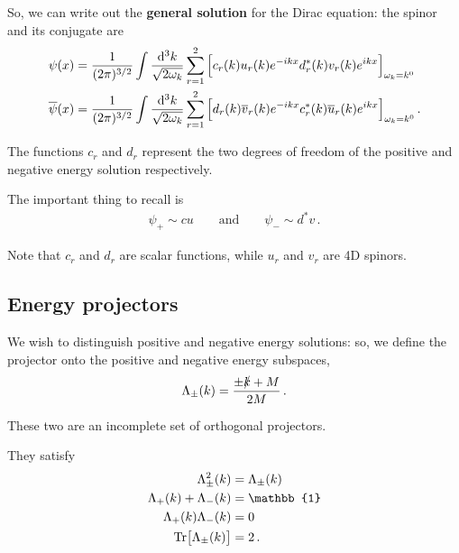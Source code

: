 \documentclass[main.tex]{subfiles}
\begin{document}

So, we can write out the \textbf{general solution} for the Dirac equation: the spinor and its conjugate are
%
\begin{subequations}
\begin{align}
\psi (x) &=
\frac{1}{(2 \pi )^{3/2}}
\int \frac{ \dd[3]{k}}{\sqrt{2 \omega_{k}}}
\sum _{r=1}^{2} \qty[
    c_r(k) u_r(k) e^{-ikx}
    d^{*}_{r} (k) v_r(k) e^{ikx}
]_{\omega_{k} = k^{0}}
\\
\overline{\psi} (x) &=
\frac{1}{(2 \pi )^{3/2}}
\int \frac{ \dd[3]{k}}{\sqrt{2 \omega_{k}}}
\sum _{r=1}^{2} \qty[
    d_r(k) \overline{v}_r(k) e^{-ikx}
    c^{*}_{r} (k) \overline{u}_r(k) e^{ikx}
]_{\omega_{k} = k^{0}}
\,.
\end{align}
\end{subequations}

The functions \(c_r\) and \(d_r\) represent the two degrees of freedom of the positive and negative energy solution respectively.

The important thing to recall is 
%
\begin{align}
\psi_{+} \sim cu \qquad \text{and} \qquad
\psi_{-} \sim d ^* v
\,.
\end{align}

Note that \(c_r\) and \(d_r\) are scalar functions, while \(u_r\) and \(v_r\) are 4D spinors.

\subsection{Energy projectors}

We wish to distinguish positive and negative energy solutions: so, we define the projector onto the positive and negative energy subspaces, 
%
\begin{align}
\Lambda_{\pm } (k) = \frac{\pm \slashed{k} + M}{2M}
\,.
\end{align}

These two are an incomplete set of orthogonal projectors.

\begin{claim}
They satisfy 
%
\begin{subequations}
\begin{align}
\Lambda_{\pm}^2 (k) &= \Lambda_{\pm} (k)  \\
\Lambda_{+} (k) + \Lambda_{-} (k) &= \mathbb{1}  \\
\Lambda_{+} (k) \Lambda_{-} (k) &= 0  \\
\Tr[\Lambda_{\pm} (k)] &= 2
\,.
\end{align}
\end{subequations}
\end{claim}
\end{document}
